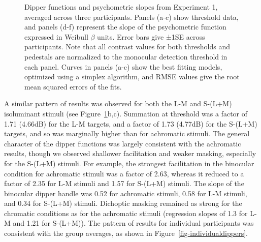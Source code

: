 \documentclass[
  letterpaper,
  DIV=11,
  numbers=noendperiod]{scrartcl}
\begin{document}
\begin{figure}


\caption{\label{fig-dipperfig}Dipper functions and psychometric slopes
from Experiment 1, averaged across three participants. Panels (a-c) show
threshold data, and panels (d-f) represent the slope of the psychometric
function expressed in Weibull \(\beta\) units. Error bars give ±1SE
across participants. Note that all contrast values for both thresholds
and pedestals are normalized to the monocular detection threshold in
each panel. Curves in panels (a-c) show the best fitting models,
optimized using a simplex algorithm, and RMSE values give the root mean
squared errors of the fits.}

\end{figure}%

A similar pattern of results was observed for both the L-M and S-(L+M)
isoluminant stimuli (see Figure~\ref{fig-dipperfig}b,c). Summation at
threshold was a factor of 1.71 (4.66dB) for the L-M targets, and a
factor of 1.73 (4.77dB) for the S-(L+M) targets, and so was marginally
higher than for achromatic stimuli. The general character of the dipper
functions was largely consistent with the achromatic results, though we
observed shallower facilitation and weaker masking, especially for the
S-(L+M) stimuli. For example, the strongest facilitation in the
binocular condition for achromatic stimuli was a factor of 2.63, whereas
it reduced to a factor of 2.35 for L-M stimuli and 1.57 for S-(L+M)
stimuli. The slope of the binocular dipper handle was 0.52 for
achromatic stimuli, 0.58 for L-M stimuli, and 0.34 for S-(L+M) stimuli.
Dichoptic masking remained as strong for the chromatic conditions as for
the achromatic stimuli (regression slopes of 1.3 for L-M and 1.21 for
S-(L+M)). The pattern of results for individual participants was
consistent with the group averages, as shown in
Figure~\ref{fig-individualdippers}.
\end{document}

